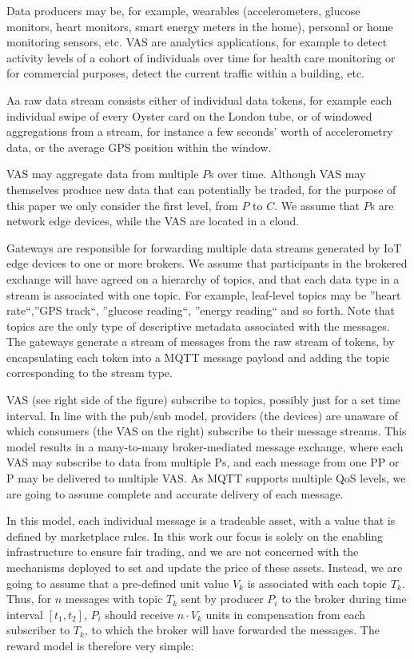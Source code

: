 \documentclass[conference]{IEEEtran}
\begin{document}
Data producers may be, for example, wearables (accelerometers, glucose monitors, heart monitors, smart energy meters in the home), personal or home monitoring sensors, etc.
VAS are analytics applications, for example to detect activity levels of a cohort of individuals over time for health care monitoring or for commercial purposes, detect the current traffic within a building, etc.

Aa raw data stream consists either of individual data tokens, for example each individual swipe of every Oyster card on the London tube, or of windowed aggregations from a stream, for instance a few seconds’ worth of accelerometry data, or the average GPS position within the window.

VAS may aggregate data from multiple $ P $s over time. Although VAS may themselves produce new data that can potentially be traded, for the purpose of this paper we only consider the first level, from $ P $ to $ C $. We assume that $ P $s are network edge devices, while the VAS are located in a cloud.

Gateways are responsible for forwarding multiple data streams generated by IoT edge devices to one or more brokers.
We assume that participants in the brokered exchange will have agreed on a hierarchy of topics, and that each data type in a stream is associated with one topic. For example, leaf-level topics may be ''heart rate``,''GPS track``, ''glucose reading``, ''energy reading`` and so forth. Note that topics are the only type of descriptive metadata associated with the messages.
The gateways generate a stream of messages from the raw stream of tokens, by encapsulating each token into a MQTT message payload and adding the topic corresponding to the stream type.

VAS (see right side of the figure) subscribe to topics, possibly just for a set time interval. 
In line with the pub/sub model, providers (the devices) are unaware of which consumers (the VAS on the right) subscribe to their message streams.
This model results in a many-to-many broker-mediated message exchange, where each VAS may subscribe to data from multiple Ps, and each message from one PP or P may be delivered to multiple VAS. As MQTT supports multiple QoS levels, we are going to assume complete and accurate delivery of each message.

In this model, each individual message is a tradeable asset, with a value that is defined by marketplace rules. In this work our focus is solely on the enabling infrastructure to ensure fair trading, and we are not concerned with the mechanisms deployed to set and update the price of these assets. Instead, we are going to assume that a pre-defined unit value $ V_k $ is associated with each topic $ T_k $. Thus, for $ n $ messages with topic $ T_k $ sent by producer $ P_i $ to the broker during time interval $ [t_1, t_2] $, $ P_i $ should receive $ n \cdot V_k $ units in compensation from each subscriber to $ T_k $, to which the broker will have forwarded the messages. 
The reward model is therefore very simple:
\end{document}
